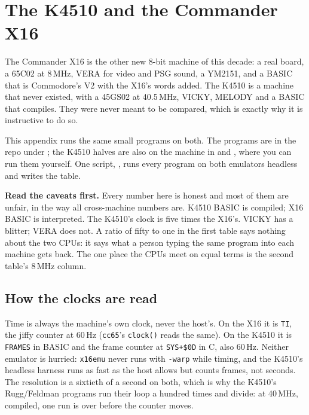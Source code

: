 \chapter{The K4510 and the Commander X16}\label{cha:x16}

The Commander X16 is the other new 8-bit machine of this
decade: a real board, a 65C02 at 8\,MHz, VERA for video and
PSG sound, a YM2151, and a BASIC that is Commodore's V2 with
the X16's words added. The K4510 is a machine that never
existed, with a 45GS02 at 40.5\,MHz, VICKY, MELODY and a
BASIC that compiles. They were never meant to be compared,
which is exactly why it is instructive to do so.

This appendix runs the same small programs on both. The
programs are in the repo under ; the K4510
halves are also on the machine in  and
, where you can run them yourself.
One script, , runs every program on
both emulators headless and writes the table.

\begin{aside}
\textbf{Read the caveats first.} Every number here is honest
and most of them are unfair, in the way all cross-machine
numbers are. K4510 BASIC is compiled; X16 BASIC is
interpreted. The K4510's clock is five times the X16's. VICKY
has a blitter; VERA does not. A ratio of fifty to one in the
first table says nothing about the two CPUs: it says what a
person typing the same program into each machine gets back.
The one place the CPUs meet on equal terms is the second
table's 8\,MHz column.
\end{aside}

\section{How the clocks are read}
Time is always the machine's own clock, never the host's. On
the X16 it is \texttt{TI}, the jiffy counter at 60\,Hz
(\texttt{cc65}'s \texttt{clock()} reads the same). On the
K4510 it is \texttt{FRAMES} in BASIC and the frame counter at
\texttt{SYS+\$0D} in C, also 60\,Hz. Neither emulator is
hurried: \texttt{x16emu} never runs with \texttt{-warp} while
timing, and the K4510's headless harness runs as fast as the
host allows but counts frames, not seconds. The resolution is
a sixtieth of a second on both, which is why the K4510's
Rugg/Feldman programs run their loop a hundred times and
divide: at 40\,MHz, compiled, one run is over before the
counter moves.

